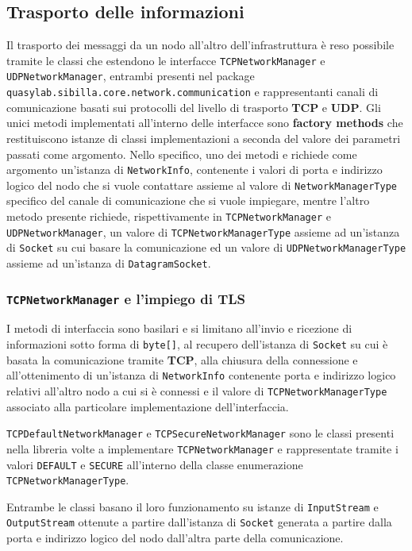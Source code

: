 \subsection{Trasporto delle informazioni}
Il trasporto dei messaggi da un nodo all'altro dell'infrastruttura è reso possibile tramite le classi che estendono le interfacce
\texttt{TCPNetworkManager} e \texttt{UDPNetworkManager}, entrambi presenti nel package \texttt{quasylab.sibilla.core.network.communication} e rappresentanti canali di comunicazione basati sui protocolli
del livello di trasporto \textbf{TCP} e \textbf{UDP}.
Gli unici metodi implementati all'interno delle interfacce sono \textbf{factory methods} che restituiscono istanze di classi implementazioni a seconda del valore dei parametri passati come argomento.
Nello specifico, uno dei metodi e richiede come argomento un'istanza di \texttt{NetworkInfo}, contenente
i valori di porta e indirizzo logico del nodo che si vuole contattare assieme al valore di \texttt{NetworkManagerType} specifico del canale di comunicazione che si vuole impiegare, mentre l'altro metodo presente
richiede, rispettivamente in \texttt{TCPNetworkManager} e \texttt{UDPNetworkManager}, un valore di \texttt{TCPNetworkManagerType} assieme ad un'istanza di \texttt{Socket} su cui basare la comunicazione ed un
valore di \texttt{UDPNetworkManagerType} assieme ad un'istanza di \texttt{DatagramSocket}.

\subsubsection{\texttt{TCPNetworkManager} e l'impiego di TLS}
I metodi di interfaccia sono basilari e si limitano all'invio e ricezione di informazioni sotto forma di \texttt{byte[]}, al recupero dell'istanza di \texttt{Socket} su cui è basata la comunicazione tramite \textbf{TCP},
alla chiusura della connessione e all'ottenimento di un'istanza di \texttt{NetworkInfo} contenente porta e indirizzo logico relativi all'altro nodo a cui si è connessi e il valore di \texttt{TCPNetworkManagerType} associato alla particolare implementazione dell'interfaccia.

\texttt{TCPDefaultNetworkManager} e \texttt{TCPSecureNetworkManager} sono le classi presenti nella libreria volte a implementare \texttt{TCPNetworkManager} e rappresentate tramite i valori
\texttt{DEFAULT} e \texttt{SECURE} all'interno della classe enumerazione \texttt{TCPNetworkManagerType}.

Entrambe le classi basano il loro funzionamento su istanze di \texttt{InputStream} e \texttt{OutputStream} ottenute a partire dall'istanza di \texttt{Socket} generata a partire dalla porta e indirizzo logico del nodo dall'altra parte della comunicazione.

